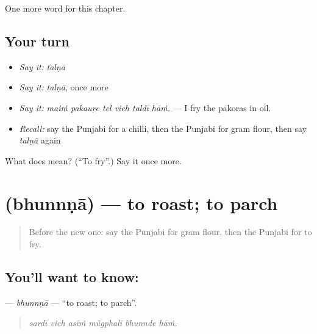 \begin{grammarlens}[title={What you've built}]
One more word for this chapter.
\end{grammarlens}

\subsection*{Your turn}
\begin{itemize}
\raggedright
  \item \emph{Say it:} \emph{talṇā}
  \item \emph{Say it:} \emph{talṇā}, once more
  \item \emph{Say it:} \emph{maiṁ pakauṛe tel vich taldī hāṁ.} — I fry the pakoras in oil.
  \item \emph{Recall:} say the Punjabi for a chilli, then the Punjabi for gram flour, then say \emph{talṇā} again
\end{itemize}

\begin{tcolorbox}[breakable,colback=teal!4,colframe=teal!35!black,title={Before you move on}]
What does  mean? (\textquotedblleft{}To fry\textquotedblright{}.) Say it once more.
\end{tcolorbox}
\section[\texorpdfstring{\pa{ਭੁੰਨਣਾ} (bhunnṇā)}{ਭੁੰਨਣਾ (bhunnṇā)}]{ (bhunnṇā) — to roast; to parch}

\label{lesson:PA-C242-bhunnna}



\begin{quote}
Before the new one: say the Punjabi for gram flour, then the Punjabi for to fry.
\end{quote}

\subsection*{You'll want to know: }
\textbf{} — \emph{bhunnṇā} — \textquotedblleft{}to roast; to parch\textquotedblright{}.

\begin{quote}
     
\end{quote}

\begin{quote}
\emph{sardī vich asīṁ mū̃gphalī bhunnde hāṁ.}
\end{quote}

